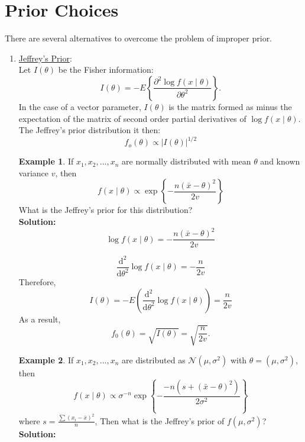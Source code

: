 \documentclass[lecture,12pt,]{pcms-l}
\numberwithin{section}{chapter}
\numberwithin{equation}{chapter}
\theoremstyle{plain}
\theoremstyle{definition}
\newtheorem{example}{Example}[section]
\theoremstyle{definition}
\begin{document}
\section{Prior Choices}
There are several alternatives to overcome the problem of improper prior.
\begin{enumerate}
\item \underline{Jeffrey's Prior}:
\\
Let $I(\theta)$ be the Fisher information:
\begin{equation}
I(\theta)=-E \left \{  \frac{\partial^2 \log f(x \mid \theta)}{\partial \theta^2}\right \}.
\end{equation}
In the case of a vector parameter, $I(\theta)$ is the matrix formed as minus the expectation of the matrix of second order partial derivatives of $\log f(x \mid \theta)$. The Jeffrey's prior distribution it then:
\begin{equation}
\boxed{f_o (\theta)\propto \left |  I(\theta) \right |^{1/2}}
\end{equation} 
\begin{example}
If $x_1,x_2,...,x_n$ are normally distributed with mean $\theta$ and known variance $v$, then
\begin{equation}
f(x \mid \theta) \propto \exp \left \{  - \frac{n(\bar{x}-\theta)^2}{2 v}\right \}
\end{equation}
What is the Jeffrey's prior for this distribution?
\\
\textbf{Solution:}\\
\begin{equation}
\log f(x \mid \theta) = - \frac{n(\bar{x}-\theta)^2}{2 v}
\end{equation}

\begin{equation}
\frac{\mathrm{d}^2}{\mathrm{d} \theta^2}\log f(x \mid \theta) = -\frac{n}{2 v}
\end{equation}
Therefore,
\begin{equation}
I(\theta)=-E(\frac{\mathrm{d}^2}{\mathrm{d} \theta^2}\log f(x \mid \theta)) = \frac{n}{2 v}
\end{equation}
As a result,
\begin{equation}
f_0(\theta)= \sqrt{I(\theta)} = \sqrt{\frac{n}{2 v}}.
\end{equation}
\end{example}

\begin{example}
If $x_1,x_2,...,x_n$ are distributed as $\mathcal{N}(\mu,\sigma^2)$ with $\theta=(\mu,\sigma^2)$, then
\begin{equation}
f(x \mid \theta) \propto \sigma^{-n} \exp \left \{  - \frac{-n(s+(\bar{x}-\theta)^2)}{2 \sigma^2}\right \}
\end{equation}
where $s=\frac{\sum (x_i -\bar{x})^2}{n}$, Then what is the Jeffrey's prior of $f(\mu,\sigma^2)$?
\\
\textbf{Solution:}\\
\end{example}


\end{enumerate}
\end{document}
